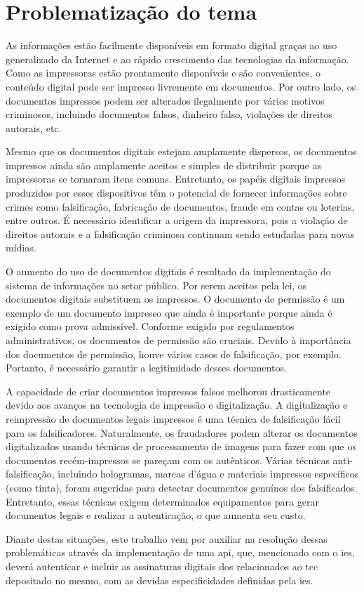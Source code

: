 \section{Problematização do tema}
As informações estão facilmente disponíveis em formato digital graças ao uso generalizado da Internet e ao rápido crescimento das tecnologias da informação. Como as impressoras estão prontamente disponíveis e são convenientes, o conteúdo digital pode ser impresso livremente em documentos. Por outro lado, os documentos impressos podem ser alterados ilegalmente por vários motivos criminosos, incluindo documentos falsos, dinheiro falso, violações de direitos autorais, etc.\cite{tsai2019}

Mesmo que os documentos digitais estejam amplamente dispersos, os documentos impressos ainda são amplamente aceitos e simples de distribuir porque as impressoras se tornaram itens comuns. Entretanto, os papéis digitais impressos produzidos por esses dispositivos têm o potencial de fornecer informações sobre crimes como falsificação, fabricação de documentos, fraude em contas ou loterias, entre outros. É necessário identificar a origem da impressora, pois a violação de direitos autorais e a falsificação criminosa continuam sendo estudadas para novas mídias.\cite{tsai2019}

O aumento do uso de documentos digitais é resultado da implementação do sistema de informações no setor público. Por serem aceitos pela lei, os documentos digitais substituem os impressos. O documento de permissão é um exemplo de um documento impresso que ainda é importante porque ainda é exigido como prova admissível. Conforme exigido por regulamentos administrativos, os documentos de permissão são cruciais. Devido à importância dos documentos de permissão, houve vários casos de falsificação, por exemplo. Portanto, é necessário garantir a legitimidade desses documentos.\cite{arief2019}

A capacidade de criar documentos impressos falsos melhorou drasticamente devido aos avanços na tecnologia de impressão e digitalização. A digitalização e reimpressão de documentos legais impressos é uma técnica de falsificação fácil para os falsificadores. Naturalmente, os fraudadores podem alterar os documentos digitalizados usando técnicas de processamento de imagens para fazer com que os documentos recém-impressos se pareçam com os autênticos. Várias técnicas anti-falsificação, incluindo hologramas, marcas d'água e materiais impressos específicos (como tinta), foram sugeridas para detectar documentos genuínos dos falsificados. Entretanto, essas técnicas exigem determinados equipamentos para gerar documentos legais e realizar a autenticação, o que aumenta seu custo.\cite{zhang2019}

Diante destas situações, este trabalho vem por auxiliar na resolução dessas problemáticas através da implementação de uma \acrfull{api}, que, mencionado com o \acrlong{ies}, deverá autenticar e incluir as assinaturas digitais dos relacionados ao \acrfull{tcc} depositado no mesmo, com as devidas especificidades definidas pela \acrshort{ies}.